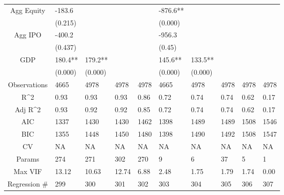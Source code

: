 \documentclass{article}
\begin{document}
\begin{table}[H]
\begin{tabular}{|clllllllll|}
  Agg Equity & -183.6 &  &  &  & -876.6** &  &  &  &  \\
   & (0.215) &  &  &  & (0.000) &  &  &  &  \\
  Agg IPO & -400.2 &  &  &  & -956.3 &  &  &  &  \\
   & (0.437) &  &  &  & (0.45) &  &  &  &  \\
  GDP & 180.4** & 179.2** &  &  & 145.6** & 133.5** &  &  &  \\
   & (0.000) & (0.000) &  &  & (0.000) & (0.000) &  &  &  \\
  \hline
 Observations & 4665 & 4978 & 4978 & 4978 & 4665 & 4978 & 4978 & 4978 & 4978 \\
  R^2 & 0.93 & 0.93 & 0.93 & 0.86 & 0.72 & 0.74 & 0.74 & 0.62 & 0.17 \\
  Adj R^2 & 0.93 & 0.92 & 0.92 & 0.85 & 0.72 & 0.74 & 0.74 & 0.62 & 0.17 \\
  AIC & 1337 & 1430 & 1430 & 1462 & 1398 & 1489 & 1489 & 1508 & 1546 \\
  BIC & 1355 & 1448 & 1450 & 1480 & 1398 & 1490 & 1492 & 1508 & 1547 \\
  CV & NA & NA & NA & NA & NA & NA & NA & NA & NA \\
  Params & 274 & 271 & 302 & 270 & 9 & 6 & 37 & 5 & 1 \\
  Max VIF & 13.12 & 10.63 & 12.74 & 6.88 & 2.48 & 1.75 & 1.79 & 1.74 & 0.00 \\
  Regression \# & 299 & 300 & 301 & 302 & 303 & 304 & 305 & 306 & 307 \\
   \hline
\end{tabular}

\end{table}
\end{document}
